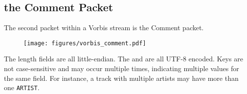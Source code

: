 \clearpage

\subsection{the Comment Packet}
\label{vorbiscomment}
The second packet within a Vorbis stream is the Comment packet.

\begin{figure}[h]
\texttt{[image: figures/vorbis\_comment.pdf]}
\end{figure}

The length fields are all little-endian.
The  and  are all UTF-8 encoded.
Keys are not case-sensitive and may occur multiple times,
indicating multiple values for the same field.
For instance, a track with multiple artists may have
more than one \texttt{ARTIST}.

